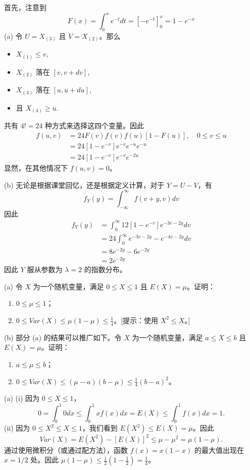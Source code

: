 \begin{questions}
\begin{solution}
首先，注意到
\[
F(x) = \int_0^x e^{-t} dt = \left[ -e^{-t} \right]_0^x = 1 - e^{-x}
\]
(a) 令 $U = X_{(3)}$ 且 $V = X_{(2)}$。那么
\begin{itemize}
    \item $X_{(1)} \le v$,
    \item $X_{(2)}$ 落在 $[v, v + dv]$,
    \item $X_{(3)}$ 落在 $[u, u + du]$,
    \item 且 $X_{(4)} \ge u$.
\end{itemize}
共有 $4! = 24$ 种方式来选择这四个变量。因此
\begin{align*}
f(u, v) &= 24 F(v) f(v) f(u) [1 - F(u)], \quad 0 \le v \le u \\
&= 24 [1 - e^{-v}] e^{-v} e^{-u} e^{-u} \\
&= 24 [1 - e^{-v}] e^{-v} e^{-2u}
\end{align*}
显然，在其他情况下 $f(u, v) = 0$。

(b) 无论是根据课堂回忆，还是根据定义计算，对于 $Y = U - V$，有
\[
f_Y(y) = \int_{-\infty}^{\infty} f(v + y, v) dv
\]
因此
\begin{align*}
f_Y(y) &= \int_0^{\infty} 12 [1 - e^{-v}] e^{-3v - 2y} dv \\
&= 24 \int_0^{\infty} e^{-3v - 2y} - e^{-4v - 2y} dv \\
&= 8e^{-2y} - 6e^{-2y} \\
&= 2e^{-2y}
\end{align*}
因此 $Y$ 服从参数为 $\lambda = 2$ 的指数分布。
\end{solution}

\question
(a) 令 $X$ 为一个随机变量，满足 $0 \le X \le 1$ 且 $E(X) = \mu$。证明：
\begin{enumerate}
    \item $0 \le \mu \le 1$；
    \item $0 \le Var(X) \le \mu(1 - \mu) \le \frac{1}{4}$。[提示：使用 $X^2 \le X$。]
\end{enumerate}
(b) 部分 (a) 的结果可以推广如下。令 $X$ 为一个随机变量，满足 $a \le X \le b$ 且 $E(X) = \mu$。证明：
\begin{enumerate}
    \item $a \le \mu \le b$；
    \item $0 \le Var(X) \le (\mu - a)(b - \mu) \le \frac{1}{4}(b - a)^2$。
\end{enumerate}

\begin{solution}
(a) (i) 因为 $0 \le X \le 1$，
\[
0 = \int_0^1 0 dx \le \int_0^1 xf(x) dx = E(X) \le \int_0^1 f(x) dx = 1.
\]
(ii) 因为 $0 \le X^2 \le X \le 1$，我们看到 $E(X^2) \le E(X) = \mu$。因此
\[
Var(X) = E(X^2) - [E(X)]^2 \le \mu - \mu^2 = \mu(1 - \mu).
\]
通过使用微积分（或通过配方法），函数 $f(x) = x(1 - x)$ 的最大值出现在 $x = 1/2$ 处。因此 $\mu(1 - \mu) \le \frac{1}{2}(1 - \frac{1}{2}) = \frac{1}{4}$。


\end{solution}
\end{questions}

